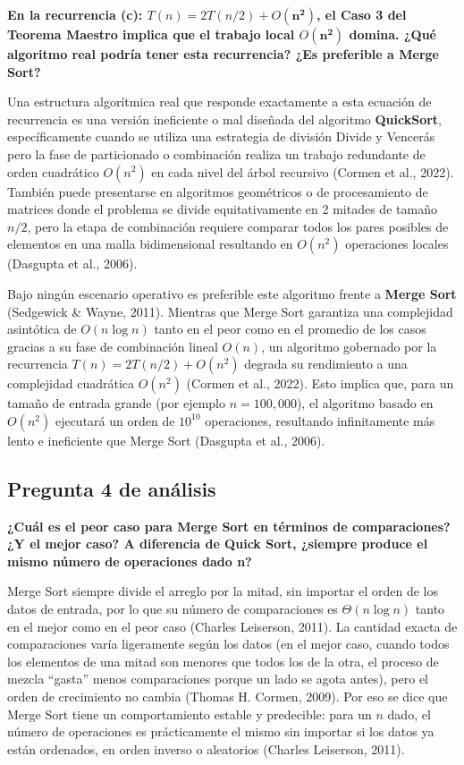\documentclass[12pt,a4paper]{article}
\begin{document}
\textbf{En la recurrencia (c): $T(n) = 2T(n/2) + O(\mathbf{n^2})$, el Caso 3 del Teorema
Maestro implica que el trabajo local $O(\mathbf{n^2})$ domina. ¿Qué algoritmo real podría
tener esta recurrencia? ¿Es preferible a Merge Sort?}

Una estructura algorítmica real que responde exactamente a esta ecuación de recurrencia es una
versión ineficiente o mal diseñada del algoritmo \textbf{QuickSort}, específicamente cuando se
utiliza una estrategia de división Divide y Vencerás pero la fase de particionado o combinación
realiza un trabajo redundante de orden cuadrático $O(n^2)$ en cada nivel del árbol recursivo
(Cormen et al., 2022). También puede presentarse en algoritmos geométricos o de procesamiento
de matrices donde el problema se divide equitativamente en 2 mitades de tamaño $n/2$, pero la
etapa de combinación requiere comparar todos los pares posibles de elementos en una malla
bidimensional resultando en $O(n^2)$ operaciones locales (Dasgupta et al., 2006).

Bajo ningún escenario operativo es preferible este algoritmo frente a \textbf{Merge Sort}
(Sedgewick \& Wayne, 2011). Mientras que Merge Sort garantiza una complejidad asintótica de
$O(n \log n)$ tanto en el peor como en el promedio de los casos gracias a su fase de combinación
lineal $O(n)$, un algoritmo gobernado por la recurrencia $T(n) = 2T(n/2) + O(n^2)$ degrada su
rendimiento a una complejidad cuadrática $O(n^2)$ (Cormen et al., 2022). Esto implica que, para
un tamaño de entrada grande (por ejemplo $n = 100{,}000$), el algoritmo basado en $O(n^2)$
ejecutará un orden de $10^{10}$ operaciones, resultando infinitamente más lento e ineficiente
que Merge Sort (Dasgupta et al., 2006).

\subsection*{Pregunta 4 de análisis}

\textbf{¿Cuál es el peor caso para Merge Sort en términos de comparaciones? ¿Y el mejor caso?
A diferencia de Quick Sort, ¿siempre produce el mismo número de operaciones dado n?}

Merge Sort siempre divide el arreglo por la mitad, sin importar el orden de los datos de
entrada, por lo que su número de comparaciones es $\Theta(n \log n)$ tanto en el mejor como en
el peor caso (Charles Leiserson, 2011). La cantidad exacta de comparaciones varía ligeramente
según los datos (en el mejor caso, cuando todos los elementos de una mitad son menores que todos
los de la otra, el proceso de mezcla ``gasta'' menos comparaciones porque un lado se agota
antes), pero el orden de crecimiento no cambia (Thomas H. Cormen, 2009). Por eso se dice que
Merge Sort tiene un comportamiento estable y predecible: para un $n$ dado, el número de
operaciones es prácticamente el mismo sin importar si los datos ya están ordenados, en orden
inverso o aleatorios (Charles Leiserson, 2011).
\end{document}
